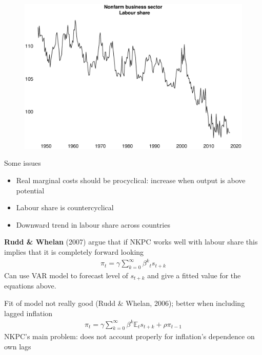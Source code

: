 \documentclass{beamer}
\begin{document}
\begin{frame}
  \begin{figure}
    \includegraphics[scale=.25]{labour_share.eps}
  \end{figure}
\end{frame}

\begin{frame}
Some issues
  \begin{itemize}    
    \item Real marginal costs should be procyclical: increase when output is above potential
    \item Labour share is countercyclical
    \item Downward trend in labour share across countries
  \end{itemize}
  \medskip
\textbf{Rudd \& Whelan} (2007) argue that if NKPC works well with labour share this implies that it is completely forward looking
\begin{align}
  \pi_t = \gamma \sum_{k=0}^{\infty} \beta^k \mathbb{}_t s_{t+k}
\end{align}
Can use VAR model to forecast level of $s_{t+k}$ and give a fitted value for the equations above.
\end{frame}

\begin{frame}
 Fit of model not really good (Rudd \& Whelan, 2006); better when including lagged inflation
\begin{align}
  \pi_t = \gamma \sum_{k=0}^{\infty} \beta^k \mathbb{E}_t s_{t+k} + \rho \pi_{t-1}
\end{align}
NKPC's main problem: does not account properly for inflation's dependence on own lags
\end{frame}
\end{document}
